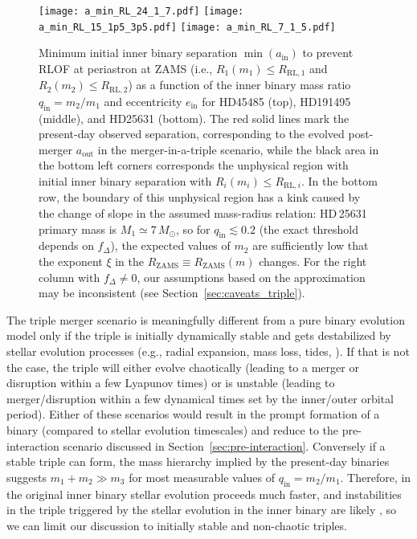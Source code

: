 \documentclass{aa}
\DeclareRobustCommand{\Secref}[1]{Section~\ref{#1}}
\begin{document}
\begin{figure}[hbtp]
  \centering
  \texttt{[image: a\_min\_RL\_24\_1\_7.pdf]}
  \texttt{[image: a\_min\_RL\_15\_1p5\_3p5.pdf]}
  \texttt{[image: a\_min\_RL\_7\_1\_5.pdf]}
  \caption{Minimum initial inner binary separation
    $\min(a_\mathrm{in})$ to prevent RLOF at periastron at ZAMS (i.e., $R_1(m_1) \leq R_\mathrm{RL,1}$ and
    $R_2(m_2)\leq R_\mathrm{RL,2}$) as a function of the inner binary
    mass ratio $q_\mathrm{in}=m_2/m_1$ and eccentricity
    $e_\mathrm{in}$ for HD45485 (top), HD191495 (middle), and HD25631
    (bottom). The red solid lines mark the present-day observed
    separation, corresponding to the evolved post-merger
    $a_\mathrm{out}$ in the merger-in-a-triple scenario, while the
    black area in the bottom left corners corresponds the unphysical
    region with initial inner binary separation with $R_i(m_i) \leq R_{\mathrm{RL},i}$. In the bottom row, the
    boundary of this unphysical region has a kink caused by the change
    of slope in the assumed mass-radius relation: HD\,25631 primary
    mass is $M_{1}\simeq 7\,M_\odot$, so for
    $q_\mathrm{in}\lesssim 0.2$ (the exact threshold depends on
    $f_\Delta$), the expected values of $m_2$ are sufficiently low
    that the exponent $\xi$ in the
    $R_\mathrm{ZAMS}\equiv R_\mathrm{ZAMS}(m)$ changes. For the right
    column with $f_\Delta\neq0$, our assumptions based on the
    \cite{blaauw:61} approximation may be inconsistent (see \Secref{sec:caveats_triple}).}
  \label{fig:min_a_in}
\end{figure}

The triple merger scenario is meaningfully different from a pure
binary evolution model only if the triple is initially dynamically stable and gets
destabilized by stellar evolution processes (e.g., radial expansion,
mass loss, tides, \citealt{perets:12}). If that is not the case, the
triple will either evolve chaotically (leading to a merger or
disruption within a few Lyapunov times) or is unstable (leading to
merger/disruption within a few dynamical times set by the inner/outer
orbital period). Either of these scenarios would result in the prompt
formation of a binary (compared to stellar evolution timescales) and
reduce to the pre-interaction scenario discussed in
\Secref{sec:pre-interaction}. Conversely if a stable triple can form,
the mass hierarchy implied by the present-day binaries suggests
$m_1+m_2 \gg m_3$ for most measurable values of
$q_\mathrm{in}=m_2/m_1$. Therefore, in the original inner binary
stellar evolution proceeds much faster, and instabilities in the
triple triggered by the stellar evolution in the inner binary are
likely \citep{perets:12}, so we can limit our discussion to initially
 stable and non-chaotic triples.
\end{document}
